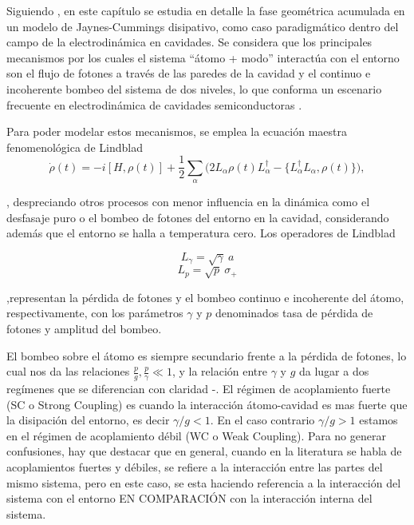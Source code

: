 Siguiendo \cite{80}, en este capítulo se estudia en detalle la fase geométrica acumulada en un modelo de Jaynes-Cummings disipativo, como caso paradigmático dentro del campo de la electrodinámica en cavidades. Se considera que los principales mecanismos por los cuales el sistema “átomo + modo” interactúa con el entorno son el flujo de fotones a través de las paredes de la cavidad y el continuo e incoherente bombeo del sistema de dos niveles, lo que conforma un escenario frecuente en electrodinámica de cavidades semiconductoras \cite{81,82,83}. 

Para poder modelar estos mecanismos, se emplea la ecuación maestra fenomenológica de Lindblad
\begin{equation}\label{eq3:lindblad}
\dot{\rho}(t) = -i [H, \rho(t)] + \frac{1}{2} \sum_\alpha \big( 2L_\alpha \rho(t) L_\alpha^{\dagger} - \{ L_\alpha^{\dagger}L_\alpha, \rho(t) \} \big),
\end{equation}

, despreciando otros procesos con menor influencia en la dinámica como el desfasaje puro o el bombeo de fotones del entorno en la cavidad, considerando además que el entorno se halla a temperatura cero. Los operadores de Lindblad

\begin{equation}
L_\gamma = \sqrt{\gamma} \ a
\end{equation}
\begin{equation}
L_p = \sqrt{p} \ \sigma_+
\end{equation}

,representan la pérdida de fotones y el bombeo continuo e incoherente del átomo, respectivamente, con los parámetros $\gamma$ y $p$ denominados tasa de pérdida de fotones y amplitud del bombeo. 

El bombeo sobre el átomo es siempre secundario frente a la pérdida de fotones, lo cual nos da las relaciones $\frac{p}{g},\frac{p}{\gamma} \ll 1$, y la relación entre $\gamma$ y $g$ da lugar a dos regímenes que se diferencian con claridad \cite{50}-\cite{54}. El régimen de acoplamiento fuerte (SC o Strong Coupling) es cuando la interacción átomo-cavidad es mas fuerte que la disipación del entorno, es decir $\gamma /g <1$. En el caso contrario $\gamma/g>1$ estamos en el régimen de acoplamiento débil (WC o Weak Coupling). Para no generar confusiones, hay que destacar que en general, cuando en la literatura se habla de acoplamientos fuertes y débiles, se refiere a la interacción entre las partes del mismo sistema, pero en este caso, se esta haciendo referencia a la interacción del sistema con el entorno EN COMPARACIÓN con la interacción interna del sistema.
